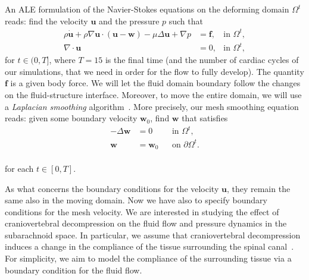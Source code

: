 \documentclass[a4paper,11pt,openright,twoside]{book}
\begin{document}


An ALE formulation of the Navier-Stokes equations on the deforming
domain $\Omega^t$ reads: find the velocity $\mathbf{u}$ and the
pressure $p$ such that
\begin{align}
  \label{eq:ns:1}
  \rho \dot{\mathbf{u}}
  + \rho \nabla \mathbf{u} \cdot (\mathbf{u} - \mathbf{w})
  - \mu \Delta \mathbf{u} + \nabla p
  &= \mathbf{f},  & \text{in } \Omega^t, \\
  \label{eq:ns:2}
  \nabla \cdot \mathbf{u} &= 0, & \text{in } \Omega^t,
\end{align}
for $t \in (0, T]$, where $T=15$ is the final time (and the number of cardiac cycles of our simulations, that we need in order for the flow to fully develop). The quantity $\mathbf{f}$ is a given body force.
We will let the fluid domain boundary follow the changes on the
fluid-structure interface. Moreover, to move the entire domain, we
will use a \emph{Laplacian smoothing}
algorithm~\cite{Winslow1963}. More precisely, our mesh smoothing
equation reads: given some boundary velocity $\mathbf{w}_0$, find
$\mathbf{w}$ that satisfies
\begin{align}
\label{eq:bc:2}
- \Delta \mathbf{w} &= 0 	&& \text{in } \Omega^t, \\
\mathbf{w} &= \mathbf{w}_0 && \text{on } \partial \Omega^t .
\end{align}
\\
for each $t \in [0, T]$.



As what concerns the boundary conditions for the velocity $\mathbf{u}$, they remain the same also in the moving domain.
Now we have also to specify boundary conditions for the mesh velocity. We are interested in studying the effect of craniovertebral
decompression on the fluid flow and pressure dynamics in the
subarachnoid space. In particular, we assume that craniovertebral
decompression induces a change in the compliance of the tissue
surrounding the spinal canal~\cite{}. For simplicity, we aim to model
the compliance of the surrounding tissue via a boundary condition for
the fluid flow. 
\end{document}
